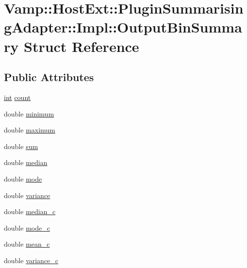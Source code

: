 \hypertarget{struct_vamp_1_1_host_ext_1_1_plugin_summarising_adapter_1_1_impl_1_1_output_bin_summary}{}\section{Vamp\+:\+:Host\+Ext\+:\+:Plugin\+Summarising\+Adapter\+:\+:Impl\+:\+:Output\+Bin\+Summary Struct Reference}
\label{struct_vamp_1_1_host_ext_1_1_plugin_summarising_adapter_1_1_impl_1_1_output_bin_summary}
\subsection*{Public Attributes}
\begin{DoxyCompactItemize}
\item 
\hyperlink{xmltok_8h_a5a0d4a5641ce434f1d23533f2b2e6653}{int} \hyperlink{struct_vamp_1_1_host_ext_1_1_plugin_summarising_adapter_1_1_impl_1_1_output_bin_summary_ad1bb60db34ce4e1df260100fa31d64b3}{count}
\item 
double \hyperlink{struct_vamp_1_1_host_ext_1_1_plugin_summarising_adapter_1_1_impl_1_1_output_bin_summary_a76d3b75daae008a94a962ed4ffb26c9b}{minimum}
\item 
double \hyperlink{struct_vamp_1_1_host_ext_1_1_plugin_summarising_adapter_1_1_impl_1_1_output_bin_summary_adb07c2cf5cd017e84f91f2898eee96b5}{maximum}
\item 
double \hyperlink{struct_vamp_1_1_host_ext_1_1_plugin_summarising_adapter_1_1_impl_1_1_output_bin_summary_a29aeb123a5f8301300e9ff10bba7a562}{sum}
\item 
double \hyperlink{struct_vamp_1_1_host_ext_1_1_plugin_summarising_adapter_1_1_impl_1_1_output_bin_summary_ac025f9a81ee07fe09f71e164b23c3caa}{median}
\item 
double \hyperlink{struct_vamp_1_1_host_ext_1_1_plugin_summarising_adapter_1_1_impl_1_1_output_bin_summary_aaa961ce6d50e72437b60813db8522af4}{mode}
\item 
double \hyperlink{struct_vamp_1_1_host_ext_1_1_plugin_summarising_adapter_1_1_impl_1_1_output_bin_summary_ae97167eec30b7f6d5c5ff7cae7d99466}{variance}
\item 
double \hyperlink{struct_vamp_1_1_host_ext_1_1_plugin_summarising_adapter_1_1_impl_1_1_output_bin_summary_ab27947866f2e8199e8e9831483ced617}{median\+\_\+c}
\item 
double \hyperlink{struct_vamp_1_1_host_ext_1_1_plugin_summarising_adapter_1_1_impl_1_1_output_bin_summary_ad712f96b74d6ee10030dd236bba3d7c9}{mode\+\_\+c}
\item 
double \hyperlink{struct_vamp_1_1_host_ext_1_1_plugin_summarising_adapter_1_1_impl_1_1_output_bin_summary_ad7c42477a738f25e86626b3cbf06e805}{mean\+\_\+c}
\item 
double \hyperlink{struct_vamp_1_1_host_ext_1_1_plugin_summarising_adapter_1_1_impl_1_1_output_bin_summary_a16395b96ff1922e9d347bc52460e2401}{variance\+\_\+c}
\end{DoxyCompactItemize}


